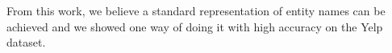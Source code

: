 \documentclass{acm_proc_article-sp}
\begin{document}
From this work, we believe a standard representation of entity names can be achieved and we showed one way of doing it with high accuracy on the Yelp dataset.


%

%
%


\balancecolumns
\end{document}
